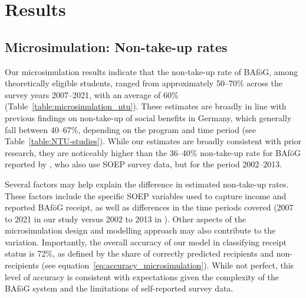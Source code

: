 %
%

\section{Results}


\subsection{Microsimulation: Non-take-up rates}

Our microsimulation results indicate that the non-take-up rate of BAföG, among theoretically eligible students, ranged from approximately 50--70\% across the survey years 2007--2021, with an average of 60\% (Table~\ref{table:microsimulation_ntu}). These estimates are broadly in line with previous findings on non-take-up of social benefits in Germany, which generally fall between 40--67\%, depending on the program and time period (see Table~\ref{table:NTU-studies}). While our estimates are broadly consistent with prior research, they are noticeably higher than the 36--40\% non-take-up rate for BAföG reported by \cite{herber_non-take-up_2019}, who also use SOEP survey data, but for the period 2002--2013.

Several factors may help explain the difference in estimated non-take-up rates. These factors include the specific SOEP variables used to capture income and reported BAföG receipt, as well as differences in the time periods covered (2007 to 2021 in our study versus 2002 to 2013 in \cite{herber_non-take-up_2019}). Other aspects of the microsimulation design and modelling approach may also contribute to the variation. Importantly, the overall accuracy of our model in classifying receipt status is 72\%, as defined by the share of correctly predicted recipients and non-recipients (see equation~\ref{eq:accuracy_microsimulation}). While not perfect, this level of accuracy is consistent with expectations given the complexity of the BAföG system and the limitations of self-reported survey data.


